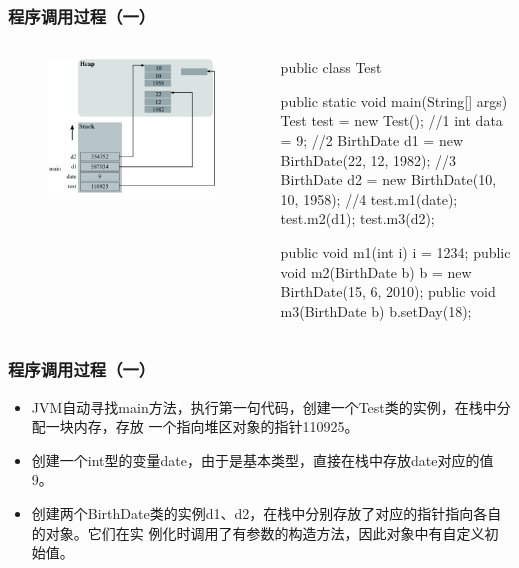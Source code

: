 \documentclass[hyperref={pdfpagelabels=false},compress,table]{beamer} %
\begin{document}
\begin{frame}[fragile] %
\frametitle{程序调用过程（一）}

\begin{columns}
\begin{figure}
\centering
\includegraphics[width=0.98\textwidth]{fig01.pdf}
\end{figure}

\begin{javaCode}\small
public class Test {
  public static void main(String[] args) {
    Test test = new Test(); //1
    int data = 9; //2
    BirthDate d1 = new BirthDate(22, 12, 1982); //3
    BirthDate d2 = new BirthDate(10, 10, 1958); //4
    test.m1(date);
    test.m2(d1);
    test.m3(d2);
  }

  public void m1(int i) {
    i = 1234;
  }
  public void m2(BirthDate b) {
    b = new BirthDate(15, 6, 2010);
  }
  public void m3(BirthDate b) {
    b.setDay(18);
  }
}
\end{javaCode}
\end{columns}
\end{frame}

\begin{frame}[fragile] %
\frametitle{程序调用过程（一）}
\begin{itemize}
\item JVM自动寻找main方法，执行第一句代码，创建一个Test类的实例，在栈中分配一块内存，存放
  一个指向堆区对象的指针110925。
\item 创建一个int型的变量date，由于是基本类型，直接在栈中存放date对应的值9。
\item 创建两个BirthDate类的实例d1、d2，在栈中分别存放了对应的指针指向各自的对象。它们在实
  例化时调用了有参数的构造方法，因此对象中有自定义初始值。
\end{itemize}
\end{frame}
\end{document}
